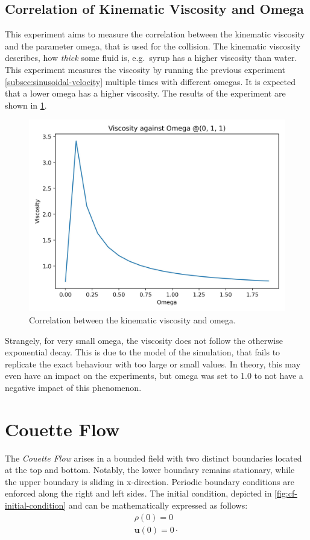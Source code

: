 \subsection{Correlation of Kinematic Viscosity and Omega}
This experiment aims to measure the correlation between the kinematic viscosity and the parameter omega, that is used for the collision.
The kinematic viscosity describes, how \textit{thick} some fluid is, e.g.\ syrup has a higher viscosity than water. %
This experiment measures the viscosity by running the previous experiment \cref{subsec:sinusoidal-velocity} multiple times with different omegas.
It is expected that a lower omega has a higher viscosity. %
The results of the experiment are shown in \cref{fig:swd-vo-viscosity-vs-omega}.

\begin{figure}[h!]
    \begin{center}
        \includegraphics[width=0.5\linewidth]{graphs/ShearWaveDecay/Viscosity/viscosity_against_omega}
        \caption{Correlation between the kinematic viscosity and omega.}
        \label{fig:swd-vo-viscosity-vs-omega}
    \end{center}
\end{figure}

Strangely, for very small omega, the viscosity does not follow the otherwise exponential decay.
This is due to the model of the simulation, that fails to replicate the exact behaviour with too large or small values. %
In theory, this may even have an impact on the experiments, but omega was set to 1.0 to not have a negative impact of this phenomenon.


\section{Couette Flow}
The \textit{Couette Flow} arises in a bounded field with two distinct boundaries located at the top and bottom.
Notably, the lower boundary remains stationary, while the upper boundary is sliding in x-direction.
Periodic boundary conditions are enforced along the right and left sides.
The initial condition, depicted in \cref{fig:cf-initial-condition} and can be mathematically expressed as follows:
\begin{equation*}
    \begin{aligned}
        \rho(0) = 0 \\
        \mathbf{u}(0) = 0 \cdot
    \end{aligned}
\end{equation*}


